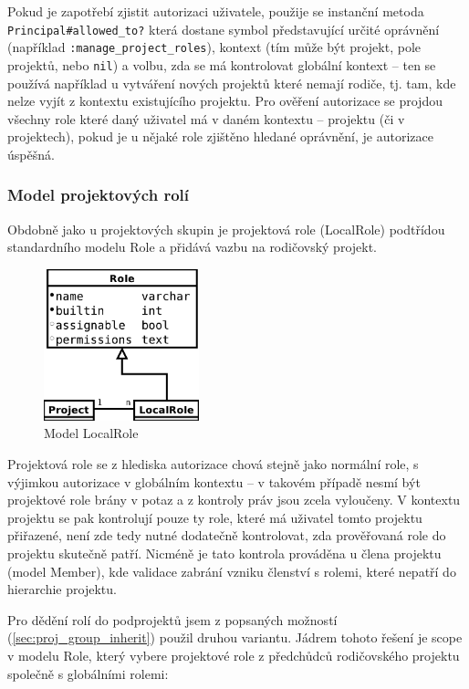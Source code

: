 \documentclass[thesis=B,czech]{FITthesis}[2012/05/02]
\begin{document}
Pokud je zapotřebí zjistit autorizaci uživatele, použije se instanční
metoda \lstinline!Principal#allowed_to?! která dostane symbol
představující určité oprávnění (například
\lstinline!:manage_project_roles!), kontext (tím může být projekt, pole
projektů, nebo \lstinline!nil!) a volbu, zda se má kontrolovat globální
kontext -- ten se používá například u vytváření nových projektů které
nemají rodiče, tj. tam, kde nelze vyjít z kontextu existujícího
projektu. Pro ověření autorizace se projdou všechny role které daný
uživatel má v daném kontextu -- projektu (či v projektech), pokud je u
nějaké role zjištěno hledané oprávnění, je autorizace úspěšná.

\subsubsection{Model projektových rolí}

Obdobně jako u projektových skupin je projektová role (LocalRole)
podtřídou standardního modelu Role a přidává vazbu na rodičovský
projekt.

\begin{figure}[htbp]
\centering
\includegraphics[width=0.4\textwidth]{role-er1.pdf}
\caption{Model LocalRole}
\end{figure}

Projektová role se z hlediska autorizace chová stejně jako normální
role, s výjimkou autorizace v globálním kontextu -- v takovém případě
nesmí být projektové role brány v potaz a z kontroly práv jsou zcela
vyloučeny. V kontextu projektu se pak kontrolují pouze ty role, které má
uživatel tomto projektu přiřazené, není zde tedy nutné dodatečně
kontrolovat, zda prověřovaná role do projektu skutečně patří. Nicméně je
tato kontrola prováděna u člena projektu (model Member), kde validace
zabrání vzniku členství s rolemi, které nepatří do hierarchie projektu.

Pro dědění rolí do podprojektů jsem z popsaných možností
(\ref{sec:proj_group_inherit}) použil druhou variantu. Jádrem tohoto
řešení je \gls{scope} v modelu Role, který vybere projektové role z
předchůdců rodičovského projektu společně s globálními rolemi:
\end{document}
